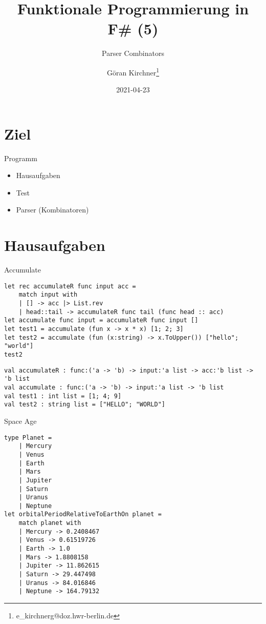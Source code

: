 \documentclass[t]{beamer}
\author{Göran Kirchner\thanks{e\_kirchnerg@doz.hwr-berlin.de}}
\date{2021-04-23}
\title{Funktionale Programmierung in F\# (5)}
\subtitle{Parser Combinators}
\begin{document}
\maketitle

\section{Ziel }
\label{sec:org752face}
\begin{frame}[label={sec:org7546044}]{Programm}
\begin{itemize}
\item Hausaufgaben
\item Test
\item Parser (Kombinatoren)
\end{itemize}
\end{frame}

\section{Hausaufgaben }
\label{sec:org8bdfb57}
\begin{frame}[label={sec:org2d35456},fragile]{Accumulate}
 \begin{verbatim}
let rec accumulateR func input acc = 
    match input with
    | [] -> acc |> List.rev
    | head::tail -> accumulateR func tail (func head :: acc)
let accumulate func input = accumulateR func input []
let test1 = accumulate (fun x -> x * x) [1; 2; 3]
let test2 = accumulate (fun (x:string) -> x.ToUpper()) ["hello"; "world"]
test2
\end{verbatim}

\begin{verbatim}
val accumulateR : func:('a -> 'b) -> input:'a list -> acc:'b list -> 'b list
val accumulate : func:('a -> 'b) -> input:'a list -> 'b list
val test1 : int list = [1; 4; 9]
val test2 : string list = ["HELLO"; "WORLD"]
\end{verbatim}
\end{frame}

\begin{frame}[label={sec:org7536e38},fragile]{Space Age}
 \begin{verbatim}
type Planet = 
    | Mercury
    | Venus
    | Earth
    | Mars
    | Jupiter
    | Saturn
    | Uranus
    | Neptune
let orbitalPeriodRelativeToEarthOn planet = 
    match planet with
    | Mercury -> 0.2408467
    | Venus -> 0.61519726
    | Earth -> 1.0
    | Mars -> 1.8808158
    | Jupiter -> 11.862615
    | Saturn -> 29.447498
    | Uranus -> 84.016846
    | Neptune -> 164.79132
\end{verbatim}
\end{frame}
\end{document}
